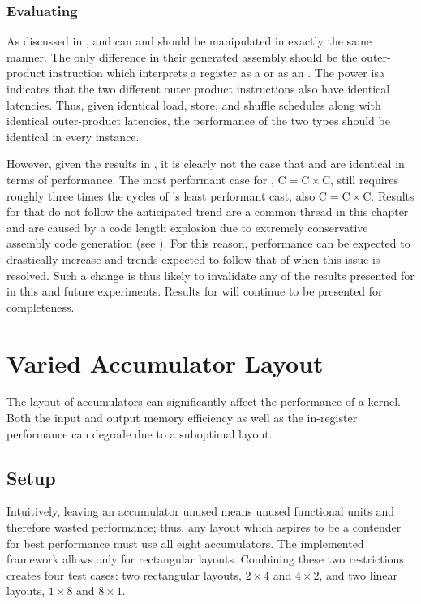 \documentclass[\main/thesis.tex]{subfiles}
\begin{document}
\subsubsection{Evaluating \texorpdfstring{}{half}}
As discussed in ,  and  can and should be manipulated in exactly the same manner.
The only difference in their generated assembly should be the outer-product instruction which interprets a register as a  or as an .
The \gls{power} \gls{isa} indicates that the two different outer product instructions also have identical latencies.
Thus, given identical load, store, and shuffle schedules along with identical outer-product latencies, the performance of the two types should be identical in every instance.

However, given the results in , it is clearly not the case that  and  are identical in terms of performance.
The most performant case for , $\textrm{C} = \textrm{C} \times \textrm{C}$, still requires roughly three times the cycles of 's least performant cast, also $\textrm{C} = \textrm{C} \times \textrm{C}$.
Results for  that do not follow the anticipated trend are a common thread in this chapter and are caused by a code length explosion due to extremely conservative assembly code generation (see ).
For this reason, performance can be expected to drastically increase and trends expected to follow that of  when this issue is resolved.
Such a change is thus likely to invalidate any of the results presented for  in this and future experiments.
Results for  will continue to be presented for completeness.

\section{Varied Accumulator Layout}
The layout of accumulators can significantly affect the performance of a kernel.
Both the input and output memory efficiency as well as the in-register performance can degrade due to a suboptimal layout.

\subsection{Setup}
Intuitively, leaving an accumulator unused means unused functional units and therefore wasted performance; thus, any layout which aspires to be a contender for best performance must use all eight accumulators.
The implemented framework allows only for rectangular layouts.
Combining these two restrictions creates four test cases: two rectangular layouts, $2 \times 4$ and $4 \times 2$, and two linear layouts, $1 \times 8$ and $8 \times 1$.
\end{document}

